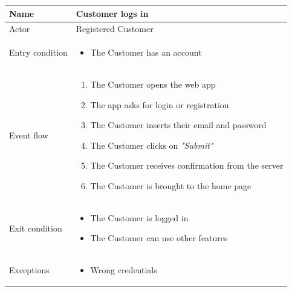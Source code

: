 \begin{table}[H]
    \begin{tabu} to \textwidth {|X|X[4]|}
        \hline
        Name            & Customer logs in           \\ \hline
        Actor           & Registered Customer        \\ \hline
        Entry condition & \begin{itemize}
            \item The Customer has an account
        \end{itemize} \\ \hline
        Event flow      & \begin{enumerate}
            \item The Customer opens the web app
            \item The app asks for login or registration
            \item The Customer inserts their email and password
            \item The Customer clicks on \emph{"Submit"}
            \item The Customer receives confirmation from the server
            \item The Customer is brought to the home page
        \end{enumerate} \\ \hline
        Exit condition  & \begin{itemize}
            \item The Customer is logged in
            \item The Customer can use other features
        \end{itemize} \\ \hline
        Exceptions      & \begin{itemize}
            \item Wrong credentials
        \end{itemize} \\ \hline
    \end{tabu}
\end{table}

